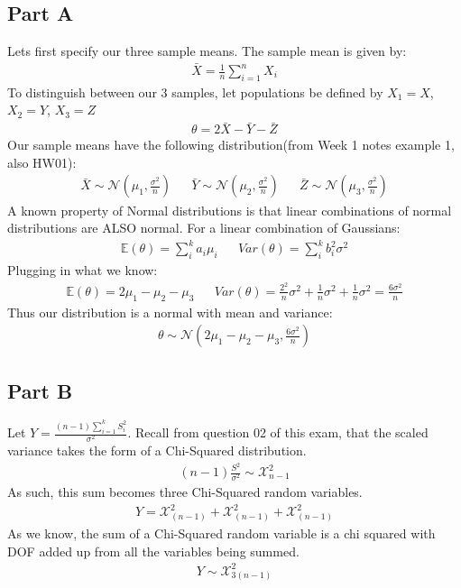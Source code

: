 \documentclass{article}
\begin{document}
\subsection*{Part A}
Lets first specify our three sample means. The sample mean is given by:
\begin{align*}
\bar{X} = \frac{1}{n} \sum_{i=1}^{n} X_i
\end{align*}
To distinguish between our 3 samples, let populations be defined by $X_1 = X$, $X_2=Y$, $X_3 = Z$
\begin{align*}
\theta = 2\bar{X} - \bar{Y} - \bar{Z}
\end{align*}
Our sample means have the following distribution(from Week 1 notes example 1, also HW01):
\begin{align*}
\bar{X} \sim \mathcal{N}(\mu_1,\tfrac{\sigma^2}{n}) && \bar{Y} \sim \mathcal{N}(\mu_2,\tfrac{\sigma^2}{n}) && \bar{Z} \sim \mathcal{N}(\mu_3,\tfrac{\sigma^2}{n}) 
\end{align*}
A known property of Normal distributions is that linear combinations of normal distributions are ALSO normal. For a linear combination of Gaussians:
\begin{align*}
\mathbb{E}(\theta) = \sum_{i}^{k} a_i \mu_i && Var(\theta) = \sum_{i}^{k} b_i^2 \sigma^2
\end{align*}
Plugging in what we know:
\begin{align*}
\mathbb{E}(\theta) = 2\mu_1-\mu_2-\mu_3 && Var(\theta) = \frac{2^2}{n} \sigma^2 + \frac{1}{n} \sigma^2 + \frac{1}{n} \sigma^2 = \frac{6\sigma^2}{n}
\end{align*}
Thus our distribution is a normal with mean and variance:
\begin{align*}
\theta \sim \mathcal{N}(2\mu_1-\mu_2-\mu_3, \frac{6\sigma^2}{n})
\end{align*}

\subsection*{Part B}
Let $Y=\frac{(n-1)\sum_{i=1}^{k} S^2_i}{\sigma^2}$. Recall from question 02 of this exam, that the scaled variance takes the form of a Chi-Squared distribution.
\begin{align*}
(n-1)\frac{S^2}{\sigma^2} \sim \mathcal{X}^2_{n-1}
\end{align*}
As such, this sum becomes three Chi-Squared random variables.
\begin{align*}
Y = \mathcal{X}^2_{(n-1)} + \mathcal{X}^2_{(n-1)} + \mathcal{X}^2_{(n-1)}
\end{align*}
As we know, the sum of a Chi-Squared random variable is a chi squared with DOF added up from all the variables being summed.
\begin{align*}
\boxed{ Y \sim \mathcal{X}^2_{3(n-1)} }
\end{align*}
\end{document}
